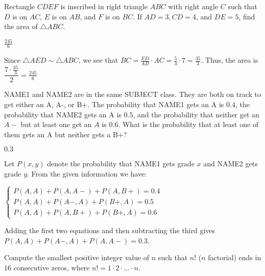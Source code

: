 \documentclass[11pt]{article}
\begin{document}
\begin{problem}%
Rectangle $CDEF$ is inscribed in right triangle $ABC$ with right angle $C$ such that $D$ is on $AC$, $E$ is on $AB$, and $F$ is on $BC$. If $AD=3, CD=4$, and $DE=5$, find the area of $\triangle ABC$.
\end{problem}

\begin{answer}
$\boxed{\frac{245}{6}}$
\end{answer}

\begin{solution}
Since $\triangle AED \sim \triangle ABC$, we see that $BC = \frac{ED}{AD} \cdot AC = \frac{5}{3} \cdot 7 = \frac{35}{3}$. Thus, the area is $\dfrac{7 \cdot \frac{35}{3}}{2} = \boxed{\frac{245}{6}}$
\end{solution}


\begin{problem}
NAME1 and NAME2 are in the same SUBJECT class. They are both on track to get either an A, A-, or B+. The probability that NAME1 gets an A is $0.4$, the probability that NAME2 gets an A is $0.5$, and the probability that neither get an $A-$ but at least one get an $A$ is $0.6$. What is the probability that at least one of them gets an A but neither gets a B+?
\end{problem}

\begin{answer}
$\boxed{0.3}$
\end{answer}

\begin{solution}
Let $P(x, y)$ denote the probability that NAME1 gets grade $x$ and NAME2 gets grade $y$. From the given information we have: \begin{center}$\begin{cases} P(A, A) + P(A, A-) + P(A, B+) = 0.4 \\ P(A, A) + P(A-, A) + P(B+, A) = 0.5 \\ P(A, A) + P(A, B+) + P(B+, A) = 0.6\end{cases}$\end{center} Adding the first two equations and then subtracting the third gives $P(A, A) + P(A-, A) + P(A, A-) = \boxed{0.3}$.
\end{solution}


\begin{problem}%
Compute the smallest positive integer value of $n$ such that $n!$ ($n$ factorial) ends in $16$ consecutive zeros, where $n! = 1 \cdot 2 \cdot \ldots \cdot n$.
\end{problem}
\end{document}
